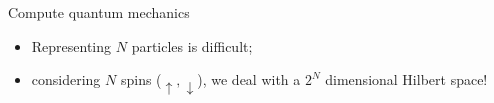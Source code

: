 \documentclass[aspectratio=169, 8pt, xcolor={svgnames}, hyperref={linkcolor=black}]{beamer}
\begin{document}
\begin{frame}{Compute quantum mechanics}
  \pause
  \begin{itemize}[noitemsep]
  \item<2,3>[\faGear] Representing $N$ particles is difficult;
  \item<3>[\faGears] considering $N$ spins ($\uparrow, \downarrow$), we deal with a $2^N$ dimensional Hilbert space!
  \end{itemize}
  \begin{multicols}{2}
    \begin{figure}
    \end{figure}
    \begin{figure}
    \end{figure}
\end{multicols}
\end{frame}
\end{document}
